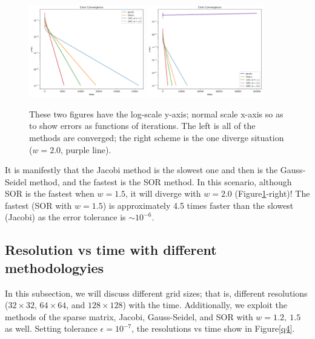 \documentclass[12pt]{article}
\begin{document}
    \begin{figure}[H]
        \centering
        \includegraphics[width = 0.45\textwidth]{./fig/3.1.png}
        \includegraphics[width = 0.45\textwidth]{./fig/3.2.png}
        \caption{These two figures have the log-scale y-axis; normal scale x-axis so as to show errors as functions of iterations. The left is all of the methods are converged; the right scheme is the one diverge situation ($w = 2.0$, purple line).}\label{q3}
    \end{figure}

    It is manifestly that the Jacobi method is the slowest one and then is the Gauss-Seidel method, and the fastest is the SOR method. In this scenario, although SOR is the fastest when $w = 1.5$, it will diverge with $w = 2.0$ (Figure\ref{q3}-right)! The fastest (SOR with $w = 1.5$) is approximately 4.5 times faster than the slowest (Jacobi) as the error tolerance is $\sim 10^{-6}$.

    \subsection{Resolution vs time with different methodologyies}
    In this subsection, we will discuss different grid sizes; that is, different resolutions ($32 \times 32$, $64 \times 64$, and $128 \times 128$) with the time. Additionally, we exploit the methods of the sparse matrix, Jacobi, Gauss-Seidel, and SOR with $w = 1.2,\ 1.5$ as well. Setting tolerance $\epsilon = 10^{-7}$, the resolutions vs time show in Figure\ref{q4}.
\end{document}
